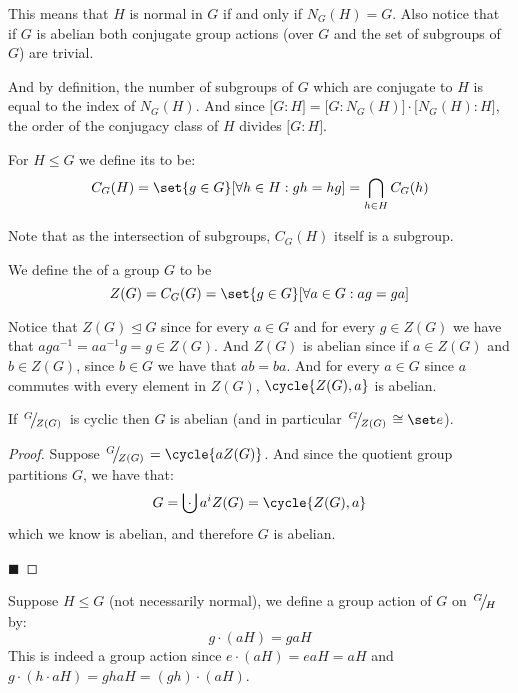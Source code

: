 \documentclass[10pt]{article}
\def\slfrac#1#2{\left.{}^{#1}\mkern-4mu\middle/\mkern-3mu{}_{#2}\right.}
\let\normalsub=\trianglelefteq
\begin{document}
This means that $H$ is normal in $G$ if and only if $N_G(H)=G$.
Also notice that if $G$ is abelian both conjugate group actions (over $G$ and the set of subgroups of $G$) are trivial.

And by definition, the number of subgroups of $G$ which are conjugate to $H$ is equal to the index of $N_G(H)$.
And since $\bigl[G:H\bigr]=\bigl[G:N_G(H)\bigr]\cdot\bigl[N_G(H):H\bigr]$, the order of the conjugacy class of $H$ divides $\bigl[G:H\bigr]$.

\begin{defn*}

    For $H\leq G$ we define its  to be:
    \[ C_G(H) = \set{g\in G}[\forall h\in H: gh=hg] = \bigcap_{h\in H}C_G(h) \]

\end{defn*}

Note that as the intersection of subgroups, $C_G(H)$ itself is a subgroup.

\begin{defn*}

    We define the  of a group $G$ to be
    \[ Z(G) = C_G(G) = \set{g\in G}[\forall a\in G: ag=ga] \]

\end{defn*}

Notice that $Z(G)\normalsub G$ since for every $a\in G$ and for every $g\in Z(G)$ we have that $aga^{-1}=aa^{-1}g=g\in Z(G)$.
And $Z(G)$ is abelian since if $a\in Z(G)$ and $b\in Z(G)$, since $b\in G$ we have that $ab=ba$.
And for every $a\in G$ since $a$ commutes with every element in $Z(G)$, $\cycle{Z(G), a}$ is abelian.

\begin{prop*}

    If $\slfrac G{Z(G)}$ is cyclic then $G$ is abelian (and in particular $\slfrac G{Z(G)}\cong\set e$).

\end{prop*}

\begin{proof}

    Suppose $\slfrac G{Z(G)}=\cycle{aZ(G)}$.
    And since the quotient group partitions $G$, we have that:
    \[ G = \bigdcup a^iZ(G) = \cycle{Z(G), a} \]
    which we know is abelian, and therefore $G$ is abelian.

    \hfill$\blacksquare$

\end{proof}

Suppose $H\leq G$ (not necessarily normal), we define a group action of $G$ on $\slfrac GH$ by:
\[ g\cdot(aH)=gaH \]
This is indeed a group action since $e\cdot(aH)=eaH=aH$ and $g\cdot(h\cdot aH)=ghaH=(gh)\cdot(aH)$.
\end{document}
